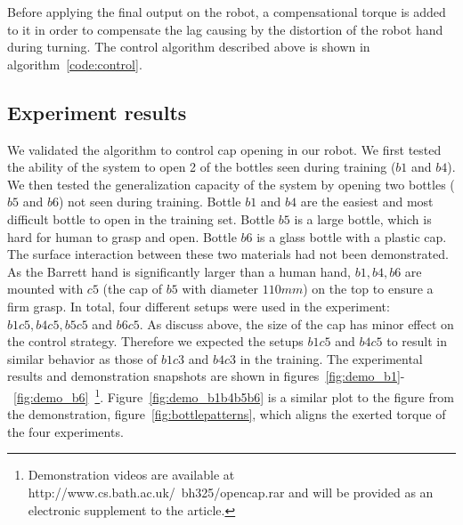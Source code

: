 
Before applying the final output on the robot, a compensational torque is
added to it in order to compensate the lag causing by the distortion
of the robot hand during turning. The control algorithm described
above is shown in algorithm~\ref{code:control}.


\subsection{Experiment results}



We validated the algorithm to control cap opening in our robot. We
first tested the ability of the system to open 2 of the bottles seen
during training ($b1$ and $b4$). We then tested the generalization
capacity of the system by opening two bottles ($b5$ and $b6$) not seen
during training.  Bottle $b1$ and $b4$ are the easiest and most difficult
bottle to open in the training set.  Bottle $b5$ is a large bottle,
which is hard for human to grasp and open. Bottle $b6$ is a glass bottle
with a plastic cap. The surface interaction between these two
materials had not been demonstrated. As the Barrett hand is
significantly larger than a human hand, $b1, b4, b6$ are mounted with
$c5$ (the cap of $b5$ with diameter $110 mm$) on the top to ensure a
firm grasp. In total, four different setups were used in the
experiment: $b1c5, b4c5, b5c5$ and $b6c5$. As discuss above, the size
of the cap has minor effect on the control strategy. Therefore we
expected the setups $b1c5$ and $b4c5$ to result in similar behavior as
those of $b1c3$ and $b4c3$ in the training. The experimental results
and demonstration snapshots are shown in
figures~\ref{fig:demo_b1}-~\ref{fig:demo_b6}~\footnote{Demonstration
  videos are available at http://www.cs.bath.ac.uk/~bh325/opencap.rar
  and will be provided as an electronic supplement to the
  article.}. Figure~\ref{fig:demo_b1b4b5b6} is a similar plot to the
figure from the demonstration, figure~\ref{fig:bottlepatterns}, which
aligns the exerted torque of the four experiments. %

